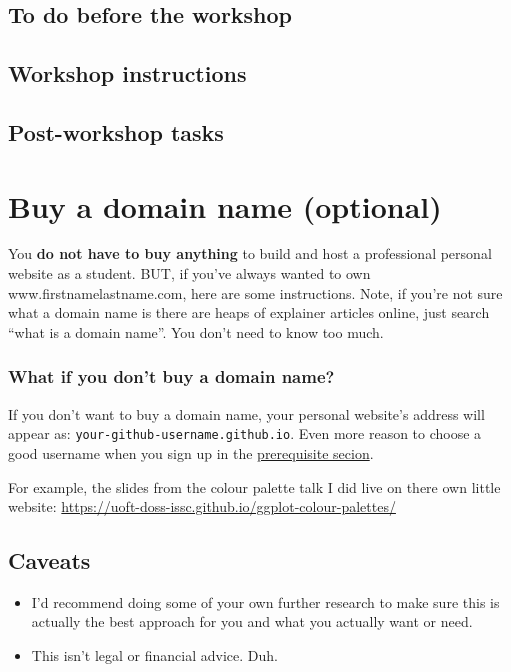 \documentclass[
]{article}
\providecommand{\tightlist}{%
  \setlength{\itemsep}{0pt}\setlength{\parskip}{0pt}}
\begin{document}
\hypertarget{to-do-before-the-workshop-2}{%
\subsection{To do before the workshop}\label{to-do-before-the-workshop-2}}

\hypertarget{workshop-instructions-2}{%
\subsection{Workshop instructions}\label{workshop-instructions-2}}

\hypertarget{post-workshop-tasks-2}{%
\subsection{Post-workshop tasks}\label{post-workshop-tasks-2}}

\hypertarget{appendix-appendix}{%
\appendix}


\hypertarget{domain}{%
\section{Buy a domain name (optional)}\label{domain}}

You \textbf{do not have to buy anything} to build and host a professional personal website as a student. BUT, if you've always wanted to own www.firstnamelastname.com, here are some instructions. Note, if you're not sure what a domain name is there are heaps of explainer articles online, just search ``what is a domain name''. You don't need to know too much.

\hypertarget{what-if-you-dont-buy-a-domain-name}{%
\subsubsection{What if you don't buy a domain name?}\label{what-if-you-dont-buy-a-domain-name}}

If you don't want to buy a domain name, your personal website's address will appear as: \texttt{your-github-username.github.io}. Even more reason to choose a good username when you sign up in the \protect\hyperlink{prereqs}{prerequisite secion}.

For example, the slides from the colour palette talk I did live on there own little website: \url{https://uoft-doss-issc.github.io/ggplot-colour-palettes/}

\hypertarget{caveats}{%
\subsection{Caveats}\label{caveats}}

\begin{itemize}
\tightlist
\item
  I'd recommend doing some of your own further research to make sure this is actually the best approach for you and what you actually want or need.
\item
  This isn't legal or financial advice. Duh.
\end{itemize}
\end{document}
